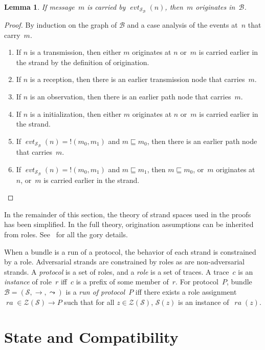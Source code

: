 \documentclass[12pt]{article}
\newtheorem{lem}[thm]{Lemma}
\newcommand{\fn}[1]{\ensuremath{\operatorname{\mathit{#1}}}}
\newcommand{\sync}{\mathord !}
\newcommand{\ssp}{\ensuremath{\mathcal{S}}}
\newcommand{\bun}{\ensuremath{\mathcal{B}}}
\newcommand{\strands}{\ensuremath{\mathcal{Z}}}
\newcommand{\evt}{\fn{evt}}
\newcommand{\ra}{\fn{ra}}
\begin{document}
\begin{lem}\label{lem:carried originates}
  If message~$m$ is carried by $\evt_{\ssp_\bun}(n)$, then~$m$
  originates in~\bun.
\end{lem}
\begin{proof}
  By induction on the graph of {\bun} and a case analysis of the
  events at~$n$ that carry~$m$.
  \begin{enumerate}
  \item If $n$ is a transmission, then either $m$ originates at $n$ or~$m$
    is carried earlier in the strand by the definition of origination.
  \item If $n$ is a reception, then there is an earlier transmission node
    that carries~$m$.
  \item If $n$ is an observation, then there is an earlier path node
    that carries~$m$.
  \item If $n$ is a initialization, then either $m$ originates at $n$ or~$m$
    is carried earlier in the strand.
  \item If $\evt_{\ssp_\bun}(n)=\sync(m_0,m_1)$ and $m\sqsubseteq
    m_0$, then there is an earlier path node that carries~$m$.
  \item If $\evt_{\ssp_\bun}(n)=\sync(m_0,m_1)$ and $m\sqsubseteq m_1$,
    then $m\sqsubseteq m_0$, or~$m$ originates at~$n$, or~$m$ is carried
    earlier in the strand.
  \end{enumerate}
  \vspace{-4.4ex}
\end{proof}

In the remainder of this section, the theory of strand spaces used in
the proofs has been simplified.  In the full theory, origination
assumptions can be inherited from roles.  See~\cite{Ramsdell13} for
all the gory details.

When a bundle is a run of a protocol, the behavior of each strand is
constrained by a role.  Adversarial strands are constrained by roles
as are non-adversarial strands.  A \emph{protocol} is a set of roles,
and a \emph{role} is a set of traces.  A trace~$c$ is an
\emph{instance} of role~$r$ iff~$c$ is a prefix of some member of~$r$.
For protocol~$P$, bundle $\bun=(\ssp,\to,\leadsto)$ is a \emph{run of
  protocol}~$P$ iff there exists a role assignment $\ra\in
\strands(\ssp)\to P$ such that for all $z\in\strands(\ssp)$, $\ssp(z)$ is an
instance of~$\ra(z)$.

\section{State and Compatibility}
\end{document}
